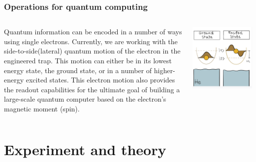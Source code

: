 \documentclass{beamer}
\begin{document}
\frame
    {
      \frametitle{Operations for quantum computing}
	
      \begin{footnotesize}
     \begin{columns}
       \column{5.0cm}
Quantum information can be encoded in a number of ways using single electrons. Currently, we are working with the side-to-side(lateral) quantum motion of the electron in the engineered trap. This motion can either be in its lowest energy state, the ground state, or in a number of higher-energy excited states. This electron motion also provides the readout capabilities for the ultimate goal of building a large-scale quantum computer based on the electron's magnetic moment (spin).       
\column{5cm}
      \begin{center}
	\includegraphics[width=1.2\textwidth]{qcfigures/nordicquantumfig4.png}
      \end{center}
\end{columns}
      \end{footnotesize}
    }
    
\section{Experiment and theory}
\end{document}
